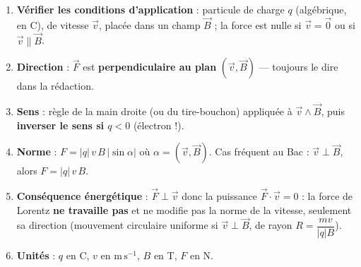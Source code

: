 \documentclass[11pt]{article}
\begin{document}
\begin{methode}[Caractéristiques de la force de Lorentz $\vec{F} = q\,\vec{v} \wedge \vec{B}$]
\begin{enumerate}
\item \textbf{Vérifier les conditions d'application} : particule de charge $q$ (algébrique, en C), de vitesse $\vec{v}$, placée dans un champ $\vec{B}$ ; la force est nulle si $\vec{v} = \vec{0}$ ou si $\vec{v} \parallel \vec{B}$.
\item \textbf{Direction} : $\vec{F}$ est \textbf{perpendiculaire au plan} $(\vec{v}, \vec{B})$ — toujours le dire dans la rédaction.
\item \textbf{Sens} : règle de la main droite (ou du tire-bouchon) appliquée à $\vec{v} \wedge \vec{B}$, puis \textbf{inverser le sens si $q < 0$} (électron !).
\item \textbf{Norme} : $F = |q|\,v\,B\,|\sin\alpha|$ où $\alpha = (\vec{v}, \vec{B})$. Cas fréquent au Bac : $\vec{v} \perp \vec{B}$, alors $F = |q|\,v\,B$.
\item \textbf{Conséquence énergétique} : $\vec{F} \perp \vec{v}$ donc la puissance $\vec{F}\cdot\vec{v} = 0$ : la force de Lorentz \textbf{ne travaille pas} et ne modifie pas la norme de la vitesse, seulement sa direction (mouvement circulaire uniforme si $\vec{v} \perp \vec{B}$, de rayon $R = \dfrac{mv}{|q|B}$).
\item \textbf{Unités} : $q$ en C, $v$ en $\mathrm{m\,s^{-1}}$, $B$ en T, $F$ en N.
\end{enumerate}
\end{methode}
\end{document}

